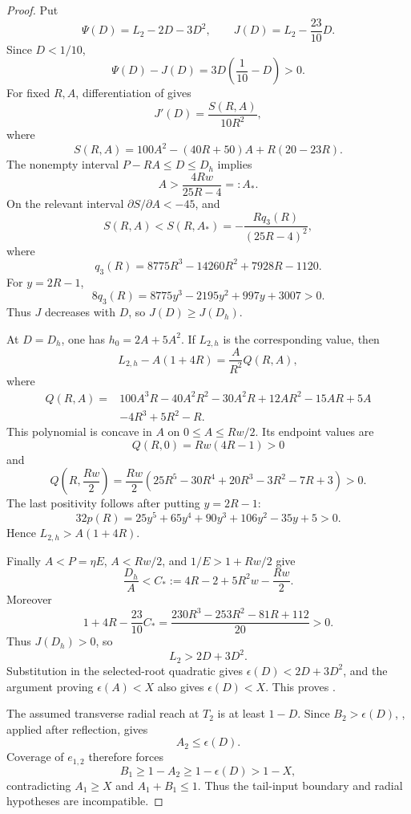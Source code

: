 \begin{proof}
Put
\[
 \Psi(D)=L_2-2D-3D^2,
 \qquad
 J(D)=L_2-\frac{23}{10}D.
\]
Since $D<1/10$,
\[
 \Psi(D)-J(D)=3D\left(\frac1{10}-D\right)>0.
\]
For fixed $R,A$, differentiation of  gives
\[
 J'(D)=\frac{S(R,A)}{10R^2},
\]
where
\[
 S(R,A)=100A^2-(40R+50)A+R(20-23R).
\]
The nonempty interval $P-RA\le D\le D_h$ implies
\[
 A>\frac{4Rw}{25R-4}=:A_*.
\]
On the relevant interval $\partial S/\partial A<-45$, and
\[
 S(R,A)<S(R,A_*)
 =-\frac{Rq_3(R)}{(25R-4)^2},
\]
where
\[
 q_3(R)=8775R^3-14260R^2+7928R-1120.
\]
For $y=2R-1$,
\[
 8q_3(R)=8775y^3-2195y^2+997y+3007>0.
\]
Thus $J$ decreases with $D$, so $J(D)\ge J(D_h)$.

At $D=D_h$, one has $h_0=2A+5A^2$.  If $L_{2,h}$ is the corresponding
value, then
\[
 L_{2,h}-A(1+4R)=\frac{A}{R^2}Q(R,A),
\]
where
\begin{align*}
Q(R,A)={}&100A^3R-40A^2R^2-30A^2R+12AR^2-15AR+5A\\
&-4R^3+5R^2-R.
\end{align*}
This polynomial is concave in $A$ on $0\le A\le Rw/2$.  Its endpoint
values are
\[
 Q(R,0)=Rw(4R-1)>0
\]
and
\[
 Q\left(R,\frac{Rw}{2}\right)
 =\frac{Rw}{2}
 (25R^5-30R^4+20R^3-3R^2-7R+3)>0.
\]
The last positivity follows after putting $y=2R-1$:
\[
 32p(R)=25y^5+65y^4+90y^3+106y^2-35y+5>0.
\]
Hence $L_{2,h}>A(1+4R)$.

Finally $A<P=\eta E$, $A<Rw/2$, and $1/E>1+Rw/2$ give
\[
 \frac{D_h}{A}
 <C_*:=4R-2+5R^2w-\frac{Rw}{2}.
\]
Moreover
\[
 1+4R-\frac{23}{10}C_*
 =\frac{230R^3-253R^2-81R+112}{20}>0.
\]
Thus $J(D_h)>0$, so
\[
 L_2>2D+3D^2.
\]
Substitution in the selected-root quadratic gives
$\epsilon(D)<2D+3D^2$, and the argument
proving $\epsilon(A)<X$ also gives $\epsilon(D)<X$.  This proves
.

The assumed transverse radial reach at $T_2$ is at least $1-D$.  Since
$B_2>\epsilon(D)$, , applied after
reflection, gives
\[
 A_2\le\epsilon(D).
\]
Coverage of $e_{1,2}$ therefore forces
\[
 B_1\ge1-A_2\ge1-\epsilon(D)>1-X,
\]
contradicting $A_1\ge X$ and $A_1+B_1\le1$. Thus the tail-input
boundary and radial hypotheses are incompatible.
\end{proof}
